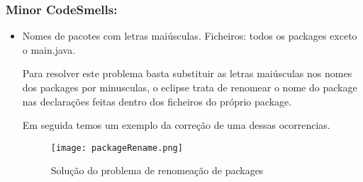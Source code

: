 \subsubsection{Minor CodeSmells:}
\begin{itemize}
\item Nomes de pacotes com letras maiúsculas.\newline
 Ficheiros: todos os packages exceto o main.java.\newline


\par Para resolver este problema basta substituir as letras maiúsculas nos nomes dos packages por minusculas, o eclipse trata de renomear o nome do package nas declarações feitas dentro dos ficheiros do próprio package.\newline
\par Em seguida temos um exemplo da correção de uma dessas ocorrencias. 
\begin{figure}[H]

  \centering

  \texttt{[image: packageRename.png]}

  \caption {Solução do problema de renomeação de packages}

  \label {fig09}

\end{figure}

\end{itemize}

